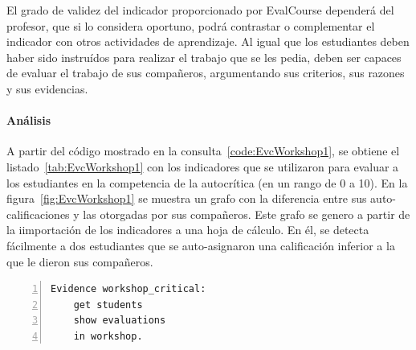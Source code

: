 El grado de validez del indicador proporcionado por EvalCourse dependerá del profesor, que si lo considera oportuno, podrá contrastar o complementar el indicador con otros actividades de aprendizaje. Al igual que los estudiantes deben haber sido instruídos para realizar el trabajo que se les pedia, deben ser capaces de evaluar el trabajo de sus compañeros, argumentando sus criterios, sus razones y sus evidencias.

\paragraph*{Análisis}

A partir del código mostrado en la consulta~\ref{code:EvcWorkshop1}, se obtiene el listado~\ref{tab:EvcWorkshop1} con los indicadores que se utilizaron para evaluar a los estudiantes en la competencia de la autocrítica (en un rango de 0 a 10). En la figura~\ref{fig:EvcWorkshop1} se muestra un grafo con la diferencia entre sus auto-calificaciones y las otorgadas por sus compañeros. Este grafo se genero a partir de la iimportación de los indicadores a una hoja de cálculo. En él, se detecta fácilmente a dos estudiantes que se auto-asignaron una calificación inferior a la que le dieron sus compañeros.

\begin{lstlisting}[caption=Extracción evaluaciones realizadas en los talleres ,label=code:EvcWorkshop1,numbers=left, captionpos=b, morekeywords={Evidence,get, students, show, milestones, evaluations, participation, access, in, assignment, forum, campus, between, and, workshop, interaction}]
Evidence workshop_critical: 
	get students
	show evaluations
	in workshop.
\end{lstlisting}

